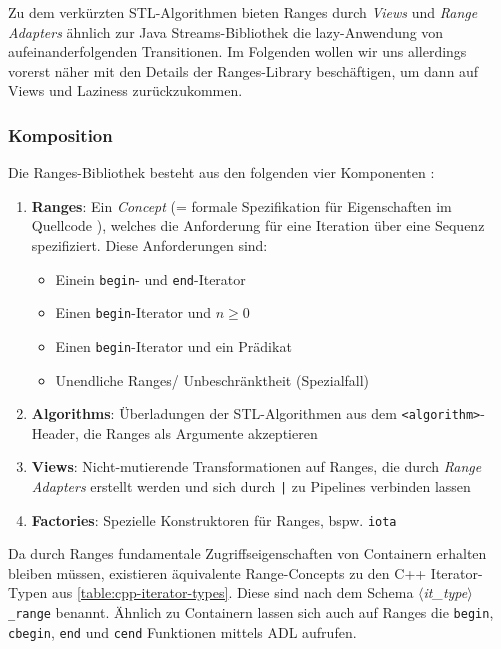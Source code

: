 \documentclass[runningheads]{llncs}
\begin{document}
Zu dem verkürzten STL-Algorithmen bieten Ranges durch \textit{Views} und \textit{Range Adapters} ähnlich zur Java Streams-Bibliothek die lazy-Anwendung von aufeinanderfolgenden Transitionen.
Im Folgenden wollen wir uns allerdings vorerst näher mit den Details der Ranges-Library beschäftigen, um dann auf Views und Laziness zurückzukommen.

\subsubsection{Komposition}

Die Ranges-Bibliothek besteht aus den folgenden vier Komponenten \cite{profcpp}:

\begin{enumerate}[1.]
	\item \textbf{Ranges}: Ein \textit{Concept} (= formale Spezifikation für Eigenschaften im Quellcode \cite[vgl. S.454 ff.]{profcpp}), welches die Anforderung für eine Iteration über eine Sequenz spezifiziert.
	      Diese Anforderungen sind:

	      \begin{itemize}
		      \item Einein \texttt{begin}- und \texttt{end}-Iterator
		      \item Einen \texttt{begin}-Iterator und $n\geqslant0$
		      \item Einen \texttt{begin}-Iterator und ein Prädikat
		      \item Unendliche Ranges/ Unbeschränktheit (Spezialfall)
	      \end{itemize}

	\item \textbf{Algorithms}: Überladungen der STL-Algorithmen aus dem \texttt{<algorithm>}-Header, die Ranges als Argumente akzeptieren

	\item \textbf{Views}: Nicht-mutierende Transformationen auf Ranges, die durch \textit{Range Adapters} erstellt werden und sich durch \texttt{|} zu Pipelines verbinden lassen

	\item \textbf{Factories}: Spezielle Konstruktoren für Ranges, bspw. \texttt{iota}
\end{enumerate}

\noindent Da durch Ranges fundamentale Zugriffseigenschaften von Containern erhalten bleiben müssen, existieren äquivalente Range-Concepts zu den C++ Iterator-Typen aus \autoref{table:cpp-iterator-types}.
Diese sind nach dem Schema $\langle$\textit{it\_type}$\rangle$\texttt{\_range} benannt.
Ähnlich zu Containern lassen sich auch auf Ranges die \texttt{begin}, \texttt{cbegin}, \texttt{end} und \texttt{cend} Funktionen mittels ADL aufrufen.
\end{document}
